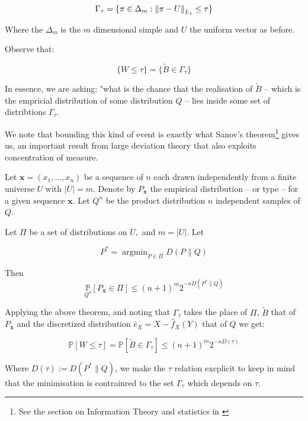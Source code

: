 $$
    \Gamma_\tau = \{ \pi \in  \Delta_m : \left\lVert\pi - U\right\rVert_{L_1} \leq \tau \}
$$

Where the $\Delta_m$ is the $m$ dimensional simple and $U$ the uniform vector as before.

Observe that: 

$$
    \{ W \leq \tau \} = \{ \tilde{B} \in \Gamma_\tau \}
$$

In essence, we are asking: "what is the chance that the realisation of $\tilde{B}$ – which is the 
empricial distribution of some distribution $Q$ – lies inside some set of distribtions $\Gamma_\tau$.

We note that bounding this kind of event is exactly what Sanov's theorem\footnote{See the section on Information Theory and statistics in 
\cite{cover1999elements}} gives us, an important
result from large deviation theory that also exploits concentration of measure.



Let $\mathbf{x} = (x_1, ..., x_n)$ be a sequence of $n$ each drawn independently from 
a finite universe $U$ with $|U| = m$. Denote by $P_\mathbf{x}$ the empirical distribution – 
or type – for a given sequence $\mathbf{x}$. Let $Q^{n}$ be the product distribution $n$
independent samples of $Q$. 

\begin{theorem}\label{sanov}

    Let $\Pi$ be a set of distributions on $U,$ and $m=|U| .$ Let

    \[
        P^{*}=\operatorname{argmin}_{P \in \Pi} D(P \| Q)
    \]
    
    Then
    \[
        \underset{Q^{n}}{\mathbb{P}}\left[P_{\mathbf{x}} \in \Pi\right] \leq(n+1)^{m} 2^{-nD\left(P^{*} \| Q\right)}
    \]
    
\end{theorem}

Applying the above theorem, and noting that $\Gamma_\tau$ takes the place of $\Pi$, $\tilde{B}$ that of $P_{\mathbf{x}}$
and the discretized distribution $\hat{e}_X = X - \hat{f}_X(Y)$ that of $Q$ we get:

\begin{equation}
    \mathbb{P}\left[W \leq \tau \right] = \mathbb{P}\left[ \tilde{B} \in \Gamma_\tau \right] 
    \leq (n+1)^{m} 2^{-nD\left( \tau \right)}
\end{equation}

Where $D\left( \tau \right) := D\left(P^{*} \| Q\right)$, we make the $\tau$ relation excplicit to 
keep in mind that the minimisation is contrainred to the set $\Gamma_\tau$ which depends on $\tau$.


